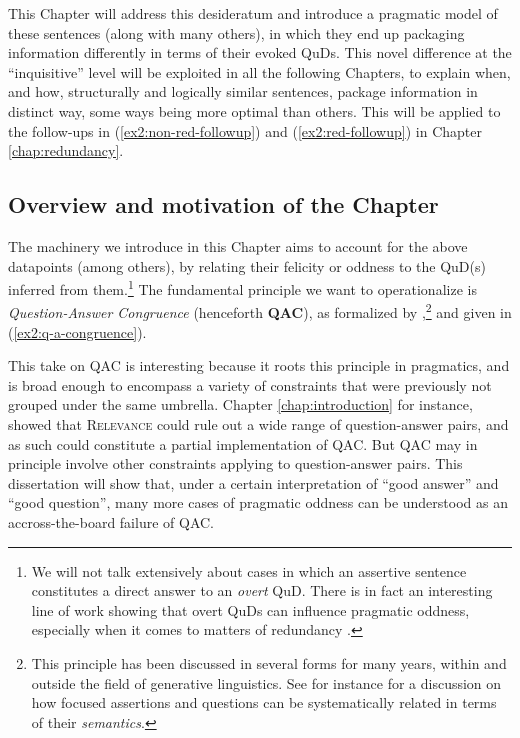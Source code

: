 This Chapter will address this desideratum and introduce a pragmatic model of these sentences (along with many others), in which they end up packaging information differently in terms of their evoked QuDs. This novel difference at the ``inquisitive'' level will be exploited in all the following Chapters, to explain when, and how, structurally and logically similar sentences, package information in distinct way, some ways being more optimal than others. This will be applied to the follow-ups in (\ref{ex2:non-red-followup}) and (\ref{ex2:red-followup}) in Chapter \ref{chap:redundancy}.

\subsection{Overview  and motivation of the Chapter}
The machinery we introduce in this Chapter aims to account for the above datapoints (among others), by relating their felicity or oddness to the QuD(s) inferred from them.\footnote{We will not talk extensively about cases in which an assertive sentence constitutes a direct answer to an \textit{overt} QuD. There is in fact an interesting line of work showing that overt QuDs can influence pragmatic oddness, especially when it comes to matters of redundancy \parencite{Haslinger2023}.} The fundamental principle we want to operationalize is \textit{Question-Answer Congruence} (henceforth \textbf{QAC}), as formalized by \textcite{Katzir2015},\footnote{This principle has been discussed in several forms for many years, within and outside the field of generative linguistics. See for instance \textcite{Rooth1992} for a discussion on how focused assertions and questions can be systematically related in terms of their \textit{semantics}.} and given in (\ref{ex2:q-a-congruence}). 

\begin{exe}
	\label{ex2:q-a-congruence}
\end{exe}

This take on QAC is interesting because it roots this principle in pragmatics, and is broad enough to encompass a variety of constraints that were previously not grouped under the same umbrella. Chapter \ref{chap:introduction} for instance, showed that \textsc{Relevance} could rule out a wide range of question-answer pairs, and as such could constitute a partial implementation of QAC. But QAC may in principle involve other constraints applying to question-answer pairs. This dissertation will show that, under a certain interpretation of ``good answer'' and ``good question'', many more cases of pragmatic oddness can be understood as an accross-the-board failure of QAC.

